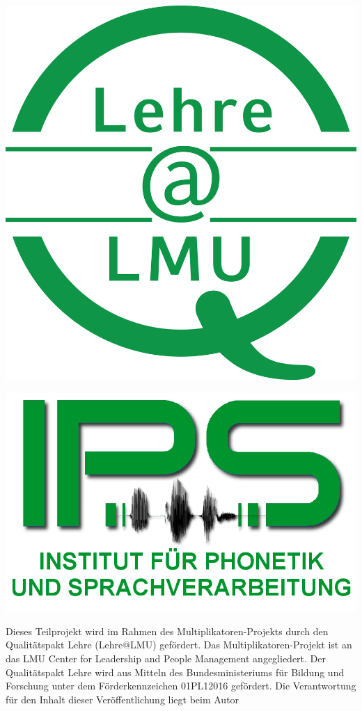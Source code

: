 \documentclass[11pt]{book}
\begin{document}
\begin{titlepage}
\begin{center}
\begin{minipage}[cb]{0.1\textwidth}
\includegraphics[width=\textwidth]{grafiken/titel/lehreatlmu.jpg}
\end{minipage}
\begin{minipage}[cb] {0.1\textwidth}
\includegraphics[width=\textwidth]{grafiken/titel/ips.png}
\end{minipage}


\begin{spacing}{0.2}
\tiny Dieses Teilprojekt wird im Rahmen des Multiplikatoren-Projekts durch den Qualitätspakt Lehre (Lehre@LMU) gefördert. Das Multiplikatoren-Projekt ist an das LMU Center for Leadership and People Management angegliedert. Der Qualitätspakt Lehre wird aus Mitteln des Bundesministeriums für Bildung und Forschung unter dem Förderkennzeichen 01PL12016 gefördert. Die Verantwortung für den Inhalt dieser Veröffentlichung liegt beim Autor \normalsize
\end{spacing}



\end{center}
\end{titlepage}
\end{document}
